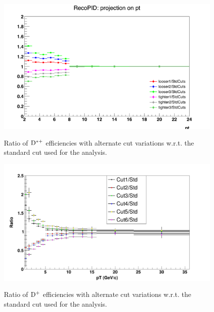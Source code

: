 \begin{figure}[h]
\centering
{\includegraphics[width=.7\linewidth]{figures/Systematics/Dstar/CutVar/RatioPromptEff1DMap.png}}
\caption{Ratio of ${\rm D^{*+}}$ efficiencies with alternate cut variations w.r.t. the standard cut used for the analysis.}
\label{fig:DstareffVars}
\end{figure}


\begin{figure}[!htbp]
\centering
{\includegraphics[width=0.70\linewidth, height=0.43\linewidth]{figures/Systematics/Dplus/Eff/EffcmpratioDplus.png}}
\caption{Ratio of ${\rm D^+}$ efficiencies with alternate cut variations w.r.t. the standard cut used for the analysis.}
\label{fig:DpluseffVars}
\end{figure}


